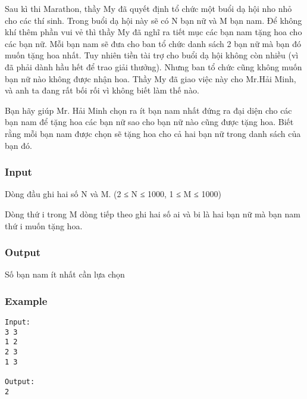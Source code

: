



   Sau kì thi Marathon, thầy My đã quyết định tổ chức một buổi dạ hội nho nhỏ cho các thí sinh. Trong buổi dạ hội này sẽ có N bạn nữ và M bạn nam. Để không khí thêm phần vui vẻ thì thầy My đã nghĩ ra tiết mục các bạn nam tặng hoa cho các bạn nữ. Mỗi bạn nam sẽ đưa cho ban tổ chức danh sách 2 bạn nữ mà bạn đó muốn tặng hoa nhất. Tuy nhiên tiền tài trợ cho buổi dạ hội không còn nhiều (vì đã phải dành hầu hết để trao giải thưởng). Nhưng ban tổ chức cũng không muốn bạn nữ nào không được nhận hoa. Thầy My đã giao việc này cho Mr.Hải Minh, và anh ta đang rất bối rối vì không biết làm thế nào.  

   Bạn hãy giúp Mr. Hải Minh chọn ra ít bạn nam nhất đứng ra đại diện cho các bạn nam để tặng hoa các bạn nữ sao cho bạn nữ nào cũng được tặng hoa. Biết rằng mỗi bạn nam được chọn sẽ tặng hoa cho cả hai bạn nữ trong danh sách của bạn đó.  

\subsubsection{   Input  }

   Dòng đầu ghi hai số N và M. (2 ≤ N ≤ 1000, 1 ≤ M ≤ 1000)  

   Dòng thứ i trong M dòng tiếp theo ghi hai số ai và bi là hai bạn nữ mà bạn nam thứ i muốn tặng hoa.  

\subsubsection{   Output  }

   Số bạn nam ít nhất cần lựa chọn  

\subsubsection{   Example  }
\begin{verbatim}
Input:
3 3
1 2
2 3
1 3

Output:
2
\end{verbatim}